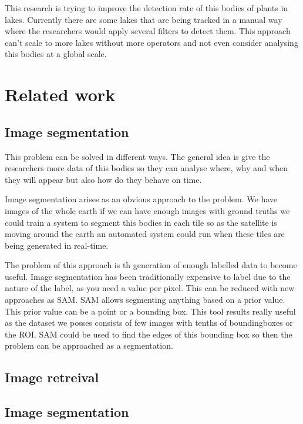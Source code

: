 \documentclass[conference]{IEEEtran}
\begin{document}
    This research is trying to improve the detection rate of this bodies of plants in lakes.
    Currently there are some lakes that are being tracked in a manual way where the researchers
    would apply several filters to detect them.
    This approach can't scale to more lakes without more operators and not even consider analysing this
    bodies at a global scale.


    \section{Related work}


    \subsection*{Image segmentation}
    This problem can be solved in different ways. The general idea is give the researchers more data
    of this bodies so they can analyse where, why and when they will appear but also how do they
    behave on time.

    Image segmentation arises as an obvious approach to the problem. We have images of the whole earth
    if we can have enough images with ground truths we could train a system to segment this bodies in
    each tile so as the satellite is moving around the earth an automated system could run when these
    tiles are being generated in real-time.

    The problem of this approach is th generation of enough labelled data to become useful.
    Image segmentation has been traditionally expensive to label due to the nature of the label, as
    you need a value per pixel.
    This can be reduced with new approaches as SAM. SAM allows segmenting anything based on a prior
    value. This prior value can be a point or a bounding box. This tool results really useful as
    the dataset we posses consists of few images with tenths of boundingboxes or the ROI.
    SAM could be used to find the edges of this bounding box so then the problem can be approached
    as a segmentation.

    \subsection{Image retreival}

    \subsection{Image segmentation}
\end{document}
